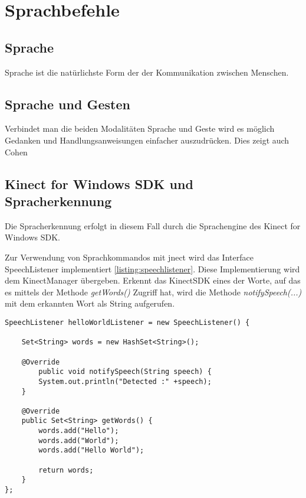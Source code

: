 \chapter{Sprachbefehle}
\label{chap:Sprachbefehle}


\section{Sprache}

Sprache ist die nat\"urlichste Form der der Kommunikation zwischen Menschen. 

\section{Sprache und Gesten}

Verbindet man die beiden Modalit\"aten Sprache und Geste wird es m\"oglich Gedanken und Handlungsanweisungen einfacher auszudr\"ucken. Dies zeigt auch Cohen~\cite{bib:}

\section{Kinect for Windows SDK und Spracherkennung}

Die Spracherkennung erfolgt in diesem Fall durch die Sprachengine des Kinect for Windows SDK.

Zur Verwendung von Sprachkommandos mit jnect wird das Interface SpeechListener implementiert \ref{listing:speechlistener}. Diese Implementierung wird dem KinectManager 
\"ubergeben. Erkennt das KinectSDK eines der Worte, auf das es mittels der Methode \textit{getWords()} Zugriff hat, wird die Methode \textit{notifySpeech(...)} mit dem 
erkannten Wort als String aufgerufen.

\lstset{language=Java,
 basicstyle=\footnotesize, 
 numbers=left,
 captionpos=b,
 showspaces=false,             
 showstringspaces=false,}
\begin{lstlisting}[caption={jnect SpeechListener Implementation}, label={listing:speechlistener}]
SpeechListener helloWorldListener = new SpeechListener() {
			
	Set<String> words = new HashSet<String>();
			
	@Override
		public void notifySpeech(String speech) {
		System.out.println("Detected :" +speech);
	}
			
	@Override
	public Set<String> getWords() {
		words.add("Hello");
		words.add("World");
		words.add("Hello World");
				
		return words;
	}
};
\end{lstlisting}


